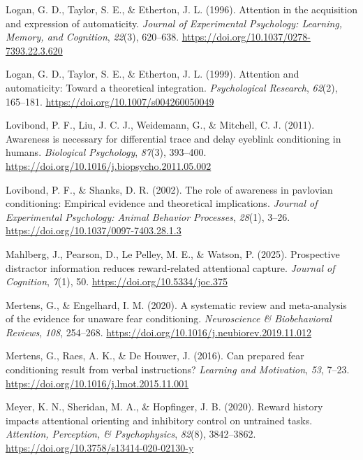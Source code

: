 \documentclass[
  jou,
  floatsintext,
  longtable,
  nolmodern,
  notxfonts,
  notimes,
  colorlinks=true,linkcolor=blue,citecolor=blue,urlcolor=blue]{apa7}
\newlength{\cslhangindent}
\newenvironment{CSLReferences}[2] %
 {\begin{list}{}{%
  \setlength{\itemindent}{0pt}
  \setlength{\leftmargin}{0pt}
  \setlength{\parsep}{0pt}
  \ifodd #1
   \setlength{\leftmargin}{\cslhangindent}
   \setlength{\itemindent}{-1\cslhangindent}
  \fi
  \setlength{\itemsep}{#2\baselineskip}}}
 {\end{list}}
\begin{document}
\begin{CSLReferences}{1}{0}
Logan, G. D., Taylor, S. E., \& Etherton, J. L. (1996). Attention in the
acquisition and expression of automaticity. \emph{Journal of
Experimental Psychology: Learning, Memory, and Cognition}, \emph{22}(3),
620--638. \url{https://doi.org/10.1037/0278-7393.22.3.620}

Logan, G. D., Taylor, S. E., \& Etherton, J. L. (1999). Attention and
automaticity: Toward a theoretical integration. \emph{Psychological
Research}, \emph{62}(2), 165--181.
\url{https://doi.org/10.1007/s004260050049}

Lovibond, P. F., Liu, J. C. J., Weidemann, G., \& Mitchell, C. J.
(2011). Awareness is necessary for differential trace and delay eyeblink
conditioning in humans. \emph{Biological Psychology}, \emph{87}(3),
393--400. \url{https://doi.org/10.1016/j.biopsycho.2011.05.002}

Lovibond, P. F., \& Shanks, D. R. (2002). The role of awareness in
pavlovian conditioning: Empirical evidence and theoretical implications.
\emph{Journal of Experimental Psychology: Animal Behavior Processes},
\emph{28}(1), 3--26. \url{https://doi.org/10.1037/0097-7403.28.1.3}

Mahlberg, J., Pearson, D., Le Pelley, M. E., \& Watson, P. (2025).
Prospective distractor information reduces reward-related attentional
capture. \emph{Journal of Cognition}, \emph{7}(1), 50.
\url{https://doi.org/10.5334/joc.375}

Mertens, G., \& Engelhard, I. M. (2020). A systematic review and
meta-analysis of the evidence for unaware fear conditioning.
\emph{Neuroscience \& Biobehavioral Reviews}, \emph{108}, 254--268.
\url{https://doi.org/10.1016/j.neubiorev.2019.11.012}

Mertens, G., Raes, A. K., \& De Houwer, J. (2016). Can prepared fear
conditioning result from verbal instructions? \emph{Learning and
Motivation}, \emph{53}, 7--23.
\url{https://doi.org/10.1016/j.lmot.2015.11.001}

Meyer, K. N., Sheridan, M. A., \& Hopfinger, J. B. (2020). Reward
history impacts attentional orienting and inhibitory control on
untrained tasks. \emph{Attention, Perception, \& Psychophysics},
\emph{82}(8), 3842--3862.
\url{https://doi.org/10.3758/s13414-020-02130-y}


\end{CSLReferences}
\end{document}
